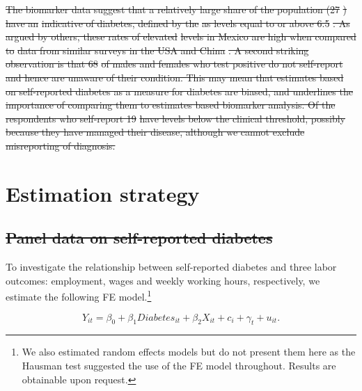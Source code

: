 \documentclass[12pt,english]{article}
\providecommand{\DIFdeltex}[1]{{\protect\color{red}\sout{#1}}}                      %
\providecommand{\DIFaddbegin}{} %
\providecommand{\DIFaddend}{} %
\providecommand{\DIFdelbegin}{} %
\providecommand{\DIFdelend}{} %
\providecommand{\DIFdel}[1]{\texorpdfstring{\DIFdeltex{#1}}{}} %
\begin{document}
\DIFdelbegin \DIFdel{The biomarker data suggest that a relatively large share of the population (27}%
\DIFdel{) have an }%
\DIFdel{indicative of diabetes, defined by the }%
\DIFdel{as levels equal to or above 6.5}%
\DIFdel{. As argued by others, these rates of elevated }%
\DIFdel{levels in Mexico are high when compared to }%
\DIFdel{data from similar surveys in the USA and China }%
\DIFdel{. 
A second striking observation is that  68}%
\DIFdel{of males and females who test positive do not self-report and hence are unaware of their condition. This may mean that estimates based on self-reported diabetes as a measure for diabetes are biased, and underlines the importance of comparing them to estimates based biomarker analysis. Of the respondents who self-report 19}%
\DIFdel{have levels below the clinical threshold, possibly because they have managed their disease, although we cannot exclude misreporting of diagnosis.
}\DIFdelend %

\section{\label{sec:Estimation Strategy}Estimation strategy}


\DIFdelbegin \subsection{\DIFdel{Panel data on self-reported diabetes}}
\addtocounter{subsection}{-1}%
\DIFdelend \DIFaddbegin \textit{}
\DIFaddend 

To investigate the relationship between self-reported diabetes and three labor outcomes: employment, wages and weekly working hours, respectively, we estimate the following \acf{FE} model.\footnote{We also estimated random effects models but do not present them here as the Hausman test suggested the use of the FE model throughout. Results are obtainable upon request.}


\noindent 
\begin{equation}
Y_{it}=\beta_{0}+\beta_{1}Diabetes_{it}+\beta_{2}X_{it}+c_{i}+\gamma_{t}+u_{it}.\label{eq:cha4_employed}
\end{equation}
\end{document}
